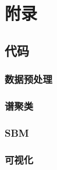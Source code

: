 \section{附录}

\subsection{代码}
\subsubsection{数据预处理}





\subsubsection{谱聚类}

\subsubsection{SBM}


\subsubsection{可视化}


